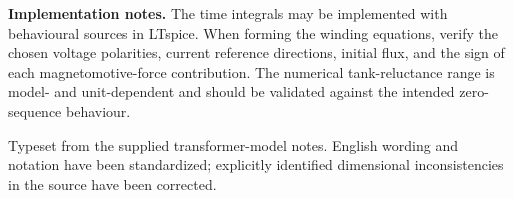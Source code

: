 \documentclass[11pt,a4paper]{article}
\newenvironment{noteBox}{%
	\par\smallskip
	\def\FrameCommand{\hspace{1pt}{\color{gold}\vrule width 2.2pt}%
		\colorbox{shadecolor}}%
	\MakeFramed{\advance\hsize-2\width\advance\hsize-2\fboxsep\FrameRestore}%
}{\endMakeFramed\par\smallskip}
\begin{document}
	\begin{noteBox}
		\textbf{Implementation notes.} The time integrals may be implemented with
		behavioural sources in LTspice. When forming the winding equations, verify the
		chosen voltage polarities, current reference directions, initial flux, and the
		sign of each magnetomotive-force contribution. The numerical tank-reluctance
		range is model- and unit-dependent and should be validated against the intended
		zero-sequence behaviour.
	\end{noteBox}
	
	\vfill
	{\small\color{muted}\sffamily
		Typeset from the supplied transformer-model notes. English wording and notation
		have been standardized; explicitly identified dimensional inconsistencies in
		the source have been corrected.}
	
\end{document}
